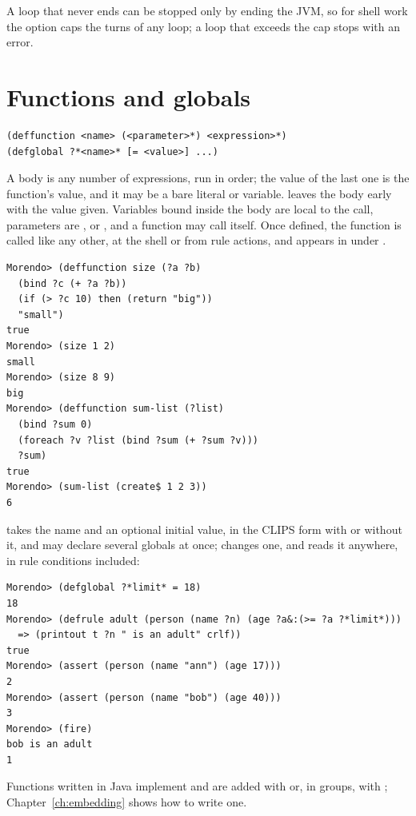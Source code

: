 A loop that never ends can be stopped only by ending the JVM, so for
shell work the option  caps the turns of
any loop; a loop that exceeds the cap stops with an error.

\section{Functions and globals}
\label{sec:deffunction}

\begin{lstlisting}
(deffunction <name> (<parameter>*) <expression>*)
(defglobal ?*<name>* [= <value>] ...)
\end{lstlisting}

A  body is any number of expressions, run in order; the
value of the last one is the function's value, and it may be a bare
literal or variable.  leaves the body early with the value
given. Variables bound inside the body are local to the call, parameters
are ,  or , and a function may call itself.
Once defined, the function is called like any other, at the shell or
from rule actions, and appears in  under
.

\begin{lstlisting}[style=shell]
Morendo> (deffunction size (?a ?b)
  (bind ?c (+ ?a ?b))
  (if (> ?c 10) then (return "big"))
  "small")
true
Morendo> (size 1 2)
small
Morendo> (size 8 9)
big
Morendo> (deffunction sum-list (?list)
  (bind ?sum 0)
  (foreach ?v ?list (bind ?sum (+ ?sum ?v)))
  ?sum)
true
Morendo> (sum-list (create$ 1 2 3))
6
\end{lstlisting}

 takes the name and an optional initial value, in the
CLIPS form with \fn{=} or without it, and may declare several globals
at once;  changes one, and  reads
it anywhere, in rule conditions included:

\begin{lstlisting}[style=shell]
Morendo> (defglobal ?*limit* = 18)
18
Morendo> (defrule adult (person (name ?n) (age ?a&:(>= ?a ?*limit*)))
  => (printout t ?n " is an adult" crlf))
true
Morendo> (assert (person (name "ann") (age 17)))
2
Morendo> (assert (person (name "bob") (age 40)))
3
Morendo> (fire)
bob is an adult
1
\end{lstlisting}

Functions written in Java implement  and
are added with  or, in groups, with
; Chapter~\ref{ch:embedding} shows
how to write one.

